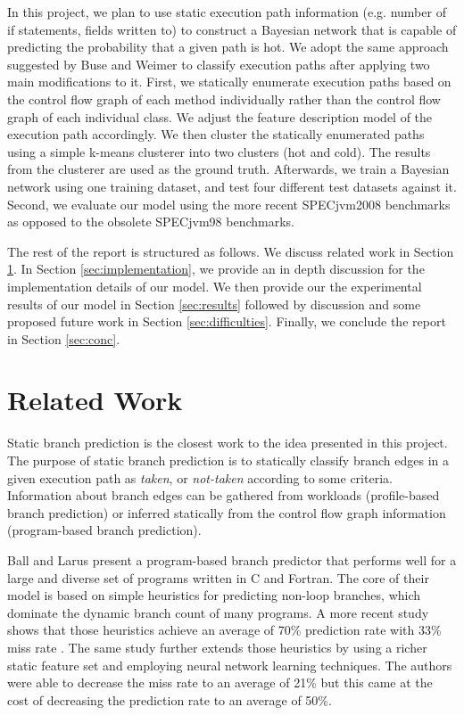 \documentclass[10pt,twocolumn,letterpaper]{article}
\begin{document}
In this project, we plan to use static execution path information (e.g. number of if statements, fields written to) to construct a Bayesian network that is
capable of predicting the probability that a given path is hot. We adopt the same approach suggested by Buse and Weimer \cite{buse2009road} to classify
execution paths after applying two main modifications to it. First, we statically enumerate execution paths based on the control flow graph of each method
individually rather than the control flow graph of each individual class. We adjust the feature description model of the execution path accordingly. We then
cluster the statically enumerated paths using a simple k-means clusterer into two clusters (hot and cold). The results from the clusterer are used as the ground
truth. Afterwards, we train a Bayesian network using one training dataset, and test four different test datasets against it. Second, we evaluate our model using
the more recent SPECjvm2008 \cite{specjvm2008} benchmarks as opposed to the obsolete SPECjvm98 \cite{specjvm98} benchmarks.

The rest of the report is structured as follows. We discuss related work in Section \ref{sec:bg}. In Section \ref{sec:implementation}, we provide an in depth
discussion for the implementation details of our model. We then provide our the experimental results of our model in Section \ref{sec:results} followed by
discussion and some proposed future work in Section \ref{sec:difficulties}. Finally, we conclude the report in Section \ref{sec:conc}.

\section{Related Work}
\label{sec:bg}
Static branch prediction is the closest work to the idea presented in this project. The purpose of static branch prediction is to statically classify branch
edges in a given execution path as \textit{taken}, or \textit{not-taken} according to some criteria. Information about branch edges can be gathered from
workloads (profile-based branch prediction) or inferred statically from the control flow graph information (program-based branch prediction).

Ball and Larus \cite{ball1993branch} present a program-based branch predictor that performs well for a large and diverse set of programs written in C and
Fortran. The core of their model is based on simple heuristics for predicting non-loop branches, which dominate the dynamic branch count of many programs.
A more recent study shows that those heuristics achieve an average of 70\% prediction rate with 33\% miss rate \cite{calder1997evidence}. The same study
further extends those heuristics by using a richer static feature set and employing neural network learning techniques. The authors were able to decrease
the miss rate to an average of 21\% but this came at the cost of decreasing the prediction rate to an average of 50\%.
\end{document}

